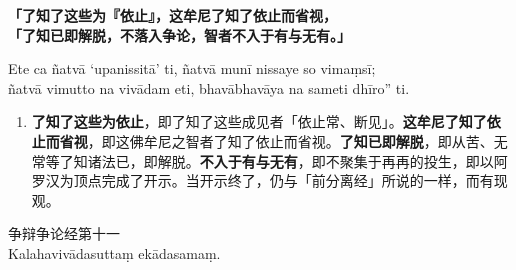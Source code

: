 \textbf{「了知了这些为『依止』，这牟尼了知了依止而省视，\\}
\textbf{「了知已即解脱，不落入争论，智者不入于有与无有。」}

Ete ca ñatvā ‘upanissitā’ ti, ñatvā munī nissaye so vimaṃsī;\\
ñatvā vimutto na vivādam eti, bhavābhavāya na sameti dhīro” ti. %

\begin{enumerate}\item \textbf{了知了这些为依止}，即了知了这些成见者「依止常、断见」。\textbf{这牟尼了知了依止而省视}，即这佛牟尼之智者了知了依止而省视。\textbf{了知已即解脱}，即从苦、无常等了知诸法已，即解脱。\textbf{不入于有与无有}，即不聚集于再再的投生，即以阿罗汉为顶点完成了开示。当开示终了，仍与「前分离经」所说的一样，而有现观。\end{enumerate}

\begin{center}\vspace{1em}争辩争论经第十一\\Kalahavivādasuttaṃ ekādasamaṃ.\end{center}